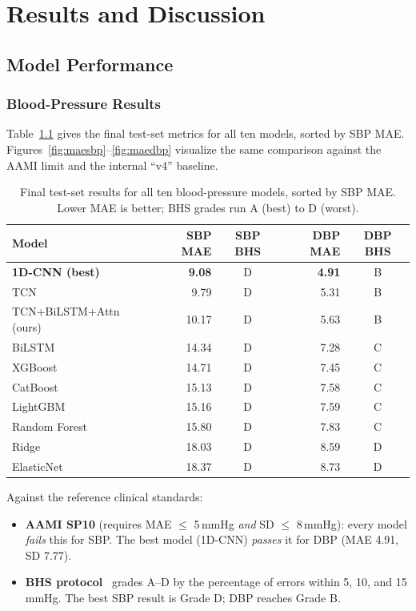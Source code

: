 \documentclass[12pt,a4paper]{report}
\begin{document}
\chapter{Results and Discussion}\label{sec:results}

\section{Model Performance}

\subsection{Blood-Pressure Results}

Table~\ref{tab:bpresults} gives the final test-set metrics for all ten models,
sorted by SBP MAE. Figures~\ref{fig:maesbp}--\ref{fig:maedbp} visualize the same
comparison against the AAMI limit and the internal ``v4'' baseline.

\begin{table}[H]
\centering
\caption{Final test-set results for all ten blood-pressure models, sorted by
SBP MAE. Lower MAE is better; BHS grades run A (best) to D (worst).}
\label{tab:bpresults}
\small
\begin{tabular}{@{}lrcrc@{}}
\toprule
\textbf{Model} & \textbf{SBP MAE} & \textbf{SBP BHS} & \textbf{DBP MAE} & \textbf{DBP BHS} \\
\midrule
\textbf{1D-CNN (best)} & \textbf{9.08} & D & \textbf{4.91} & B \\
TCN & 9.79 & D & 5.31 & B \\
TCN+BiLSTM+Attn (ours) & 10.17 & D & 5.63 & B \\
BiLSTM & 14.34 & D & 7.28 & C \\
XGBoost & 14.71 & D & 7.45 & C \\
CatBoost & 15.13 & D & 7.58 & C \\
LightGBM & 15.16 & D & 7.59 & C \\
Random Forest & 15.80 & D & 7.83 & C \\
Ridge & 18.03 & D & 8.59 & D \\
ElasticNet & 18.37 & D & 8.73 & D \\
\bottomrule
\end{tabular}
\end{table}

Against the reference clinical standards:

\begin{itemize}[leftmargin=1.4em]
  \item \textbf{AAMI SP10} (requires MAE $\le$ 5\,mmHg \emph{and} SD $\le$
  8\,mmHg): every model \emph{fails} this for SBP. The best model (1D-CNN)
  \emph{passes} it for DBP (MAE 4.91, SD 7.77).
  \item \textbf{BHS protocol}~\cite{bhs} grades A--D by the percentage of errors
  within 5, 10, and 15\,mmHg. The best SBP result is Grade D; DBP reaches
  Grade B.
\end{itemize}
\end{document}
